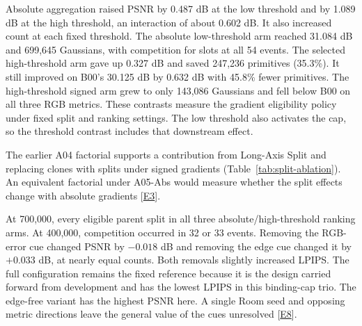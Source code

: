 Absolute aggregation raised PSNR by 0.487 dB at the low threshold and by 1.089 dB at the high threshold, an interaction of about 0.602 dB. It also increased count at each fixed threshold. The absolute low-threshold arm reached 31.084 dB and 699,645 Gaussians, with competition for slots at all 54 events. The selected high-threshold arm gave up 0.327 dB and saved 247,236 primitives (35.3\%). It still improved on B00's 30.125 dB by 0.632 dB with 45.8\% fewer primitives. The high-threshold signed arm grew to only 143,086 Gaussians and fell below B00 on all three RGB metrics. These contrasts measure the gradient eligibility policy under fixed split and ranking settings. The low threshold also activates the cap, so the threshold contrast includes that downstream effect.

The earlier A04 factorial supports a contribution from Long-Axis Split and replacing clones with splits under signed gradients (Table~\ref{tab:split-ablation}). An equivalent factorial under A05-Abs would measure whether the split effects change with absolute gradients [\hyperlink{evE3}{E3}].

At 700,000, every eligible parent split in all three absolute/high-threshold ranking arms. At 400,000, competition occurred in 32 or 33 events. Removing the RGB-error cue changed PSNR by $-0.018$ dB and removing the edge cue changed it by $+0.033$ dB, at nearly equal counts. Both removals slightly increased LPIPS. The full configuration remains the fixed reference because it is the design carried forward from development and has the lowest LPIPS in this binding-cap trio. The edge-free variant has the highest PSNR here. A single Room seed and opposing metric directions leave the general value of the cues unresolved [\hyperlink{evE8}{E8}].
